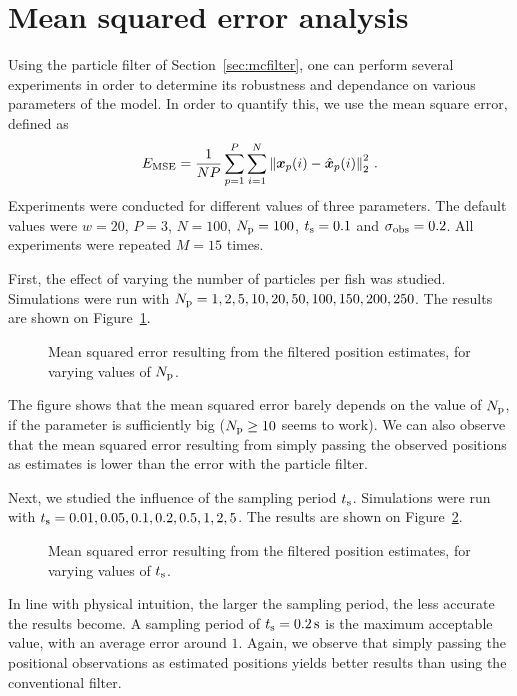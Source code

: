 \documentclass[final]{aomart}
\newtheorem[{}\it]{thm}{Theorem}[section]
\theoremstyle{definition}
\newtheorem*[{}\it]{notation}{Notation}
\numberwithin{equation}{section}
\newcommand{\ts}{t_\textnormal{s}}
\newcommand{\np}{N_\textnormal{p}}
\newcommand{\enVert}[1]{\left\lVert#1\right\rVert}
\let\norm=\enVert
\begin{document}
\section{Mean squared error analysis}
\label{sec:mseanalysis}
Using the particle filter of Section~\ref{sec:mcfilter}, one can perform several experiments in order to determine its robustness and dependance on various parameters of the model.
In order to quantify this, we use the mean square error, defined as
\begin{align}
E_{\textnormal{MSE}} = \frac{1}{NP} \sum_{p=1}^P \sum_{i=1}^N \norm{\bm{x}_p(i) - \hat{\bm{x}}_p(i)}_{2}^2\,.
\end{align}
Experiments were conducted for different values of three parameters.
The default values were \(w = 20\), \(P = 3\), \(N = 100\),  \(\np = 100\), \(\ts = 0.1\) and \(\sigma_{\textnormal{obs}} = 0.2\).
All experiments were repeated \(M = 15\) times.

First, the effect of varying the number of particles per fish was studied.
Simulations were run with \(\np = 1, 2, 5, 10, 20, 50, 100, 150, 200, 250\).
The results are shown on Figure~\ref{fig:Np}.
\begin{figure}[!htbp]
	\centering
	\scalebox{0.75}{}
	\caption{Mean squared error resulting from the filtered position estimates, for varying values of \(\np\).}
	\label{fig:Np}
\end{figure}
The figure shows that the mean squared error barely depends on the value of \(\np\), if the parameter is sufficiently big (\(\np \ge 10\) seems to work).
We can also observe that the mean squared error resulting from simply passing the observed positions as estimates is lower than the error with the particle filter.

Next, we studied the influence of the sampling period \(\ts\).
Simulations were run with \(\ts = 0.01, 0.05, 0.1, 0.2, 0.5, 1, 2, 5\).
The results are shown on Figure~\ref{fig:t_s}.
\begin{figure}[!htbp]
	\centering
	\scalebox{0.75}{}
	\caption{Mean squared error resulting from the filtered position estimates, for varying values of \(\ts\).}
	\label{fig:t_s}
\end{figure}
In line with physical intuition, the larger the sampling period, the less accurate the results become.
A sampling period of \(\ts = \SI{0.2}{\second}\) is the maximum acceptable value, with an average error around \(1\).
Again, we observe that simply passing the positional observations as estimated positions yields better results than using the conventional filter.
\end{document}
